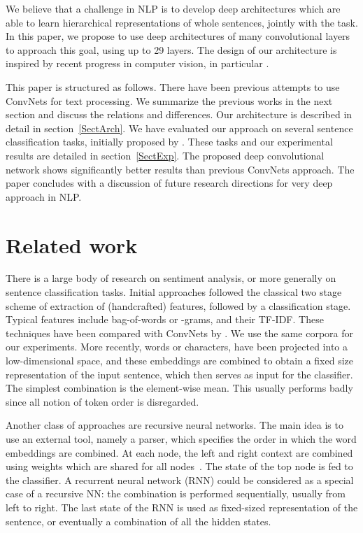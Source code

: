 \documentclass[a4paper,11pt]{article}
\begin{document}
We believe that a challenge in NLP is to develop deep architectures which
are able to learn hierarchical representations of whole sentences, jointly with
the task.  In this paper, we propose to use deep architectures of many
convolutional layers to approach this goal, using up to 29 layers.  The design of our
architecture is inspired by recent progress in computer vision, in particular
\cite{msr:2016:iclr:vgg,He:2015:resnet}.

This paper is structured as follows. There have been previous attempts to
use ConvNets for text processing. We summarize the previous works in the next
section and discuss the relations and differences.  Our architecture is
described in detail in section~\ref{SectArch}.  We have evaluated our approach
on several sentence classification tasks, initially proposed by
\cite{Zhang:2015_nips:text_convnet}. These tasks and our experimental results
are detailed in section~\ref{SectExp}.  The proposed deep convolutional network
shows significantly better results than previous ConvNets approach.  The paper concludes with a
discussion of future research directions for very deep approach in NLP.

\section{Related work}
\label{SectRelated}



There is a large body of research on sentiment analysis, or more generally on
sentence classification tasks.  Initial approaches followed the classical two
stage scheme of extraction of (handcrafted) features, followed by a
classification stage. Typical features include bag-of-words or -grams, and
their TF-IDF.  These techniques have been compared with ConvNets by
\cite{Zhang:2015_nips:text_convnet,zhang2015text}.  We use the same corpora for our
experiments.
More recently, words or characters, have been projected into a low-dimensional
space, and these embeddings are combined to obtain a fixed size representation
of the input sentence, which then serves as input for the classifier.  The
simplest combination is the element-wise mean. This usually performs badly
since all notion of token order is disregarded.

Another class of approaches are recursive neural networks.
The main idea is to use an external tool,
namely a parser, which specifies the order in which the word embeddings are
combined.  At each node, the left and right context are combined using weights
which are shared for all nodes~\cite{Socher:2011_emnlp:recur_autoenc}.  The
state of the top node is fed to the classifier.  A recurrent neural network
(RNN) could be considered as a special case of a recursive NN: the combination
is performed sequentially, usually from left to right.  The last state of the
RNN is used as fixed-sized representation of the sentence, or eventually a
combination of all the hidden states.
\end{document}
